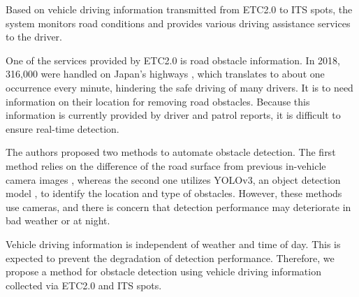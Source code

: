 \documentclass[paper]{ieice}
\begin{document}
Based on vehicle driving information transmitted from ETC2.0 to ITS spots, the system monitors road conditions and provides various driving assistance services to the driver.
%
\par
%
One of the services provided by ETC2.0 is road obstacle information.
%
In 2018, 316,000 were handled on Japan's highways \cite{obstacles}, which translates to about one occurrence every minute, hindering the safe driving of many drivers.
%
It is to need information on their location for removing road obstacles.
%
Because this information is currently provided by driver and patrol reports, it is difficult to ensure real-time detection.
%
\par
%
The authors proposed two methods to automate obstacle detection.
%
The first method relies on the difference of the road surface from previous in-vehicle camera images \cite{hisatoku}, whereas the second one utilizes YOLOv3, an object detection model \cite{wang2021front}, to identify the location and type of obstacles.
%
However, these methods use cameras, and there is concern that detection performance may deteriorate in bad weather or at night.
%
\par
%
Vehicle driving information is independent of weather and time of day.
%
This is expected to prevent the degradation of detection performance.
%
Therefore, we propose a method for obstacle detection using vehicle driving information collected via ETC2.0 and ITS spots.
%
\end{document}
